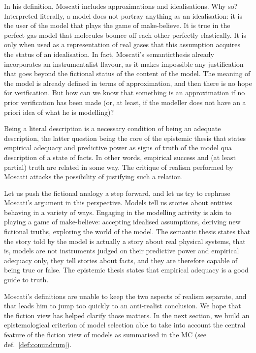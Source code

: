 \documentclass[a4paper,11pt]{article}
\theoremstyle{definition}
\begin{document}
In his definition, Moscati includes approximations and idealisations. Why so? Interpreted literally, a model does not portray anything as an idealisation: it is the user of the model that plays the game of make-believe. It is true in the perfect gas model that molecules bounce off each other perfectly elastically. It is only when used as a representation of real gases that this assumption acquires the status of an idealisation. In fact, Moscati's semanticthesis already incorporates an instrumentalist flavour, as it makes impossible any justification that goes beyond the fictional status of the content of the model. The meaning of the model is already defined in terms of approximation, and then there is no hope for verification. But how can we know that something is an approximation if no prior verification has been made (or, at least, if the modeller does not have an a priori idea of what he is modelling)?  

Being a literal description is a necessary condition of being an adequate description, the latter question being the core of the epistemic thesis that states empirical adequacy and predictive power as signs of truth of the model qua description of a state of facts. In other words, empirical success and (at least partial) truth are related in some way. The critique of realism performed by Moscati attacks the possibility of justifying such a relation.

Let us push the fictional analogy a step forward, and let us try to rephrase Moscati's argument in this perspective. Models tell us stories about entities behaving in a variety of ways. Engaging in the modelling activity is akin to playing a game of make-believe: accepting idealised assumptions, deriving new fictional truths, exploring the world of the model. The semantic thesis states that the story told by the model is actually a story about real physical systems, that is, models are not instruments judged on their predictive power and empirical adequacy only, they tell stories about facts, and they are therefore capable of being true or false. The epistemic thesis states that empirical adequacy is a good guide to truth.

Moscati's definitions are unable to keep the two aspects of realism separate, and that leads him to jump too quickly to an anti-realist conclusion. We hope that the fiction view has helped clarify those matters. In the next section, we build an epistemological criterion of model selection able to take into account the central feature of the fiction view of models as summarised in the MC (see def.~\ref{def:conundrum}). 
\end{document}
